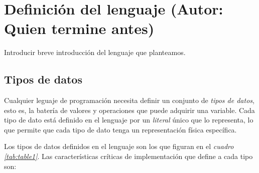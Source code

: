 \documentclass[11pt, english]{article}
\begin{document}
\newcommand{\CC}{C\nolinebreak\hspace{-.05em}\raisebox{.4ex}{\tiny\bf +}\nolinebreak\hspace{-.10em}\raisebox{.4ex}{\tiny\bf +}}
\def\CC{{C\nolinebreak[4]\hspace{-.05em}\raisebox{.4ex}{\tiny\bf ++}}}

\tableofcontents
\newpage

\section{Definición del lenguaje (Autor: Quien termine antes)}\label{Introduction}
Introducir breve introducción del lenguaje que planteamos.
\newpage

\subsection{Tipos de datos}\label{data-type}
Cualquier leguaje de programación necesita definir un conjunto de \emph{tipos de datos}, esto es, la batería de valores y operaciones que puede adquirir una variable. Cada tipo de dato está definido en el lenguaje por un \emph{literal} único que lo representa, lo que permite que cada tipo de dato tenga un representación física específica.

Los tipos de datos definidos en el lenguaje son los que figuran en el \emph{cuadro \ref{tab:table1}}. Las características críticas de implementación que define a cada tipo son:
\end{document}
